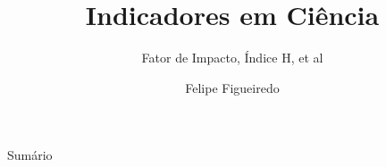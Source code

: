 \documentclass{beamer}
\title%
{Indicadores em Ciência}
\subtitle
{Fator de Impacto, Índice H, et al} %
\author%
{Felipe Figueiredo}%
\institute[INTO] %
{Instituto Nacional de Traumatologia e Ortopedia
}
\date%
{}
\begin{document}
\begin{frame}
  \titlepage
\end{frame}

\begin{frame}{Sumário}
  \tableofcontents
\end{frame}







\end{document}
